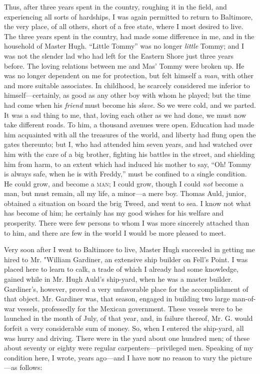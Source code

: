 Thus, after three years spent in the country, roughing it in the field,
and experiencing all sorts of hardships, I was again permitted to return
to Baltimore, the very place, of all others, short of a free state,
where I {\protect\hypertarget{307}{}{}}most desired to live. The three
years spent in the country, had made some difference in me, and in the
household of Master Hugh. ``Little Tommy'' was no longer \emph{little}
Tommy; and I was not the slender lad who had left for the Eastern Shore
just three years before. The loving relations between me and Mas' Tommy
were broken up. He was no longer dependent on me for protection, but
felt himself a \emph{man}, with other and more suitable associates. In
childhood, he scarcely considered me inferior to himself---certainly, as
good as any other boy with whom he played; but the time had come when
his \emph{friend} must become his \emph{slave}. So we were cold, and we
parted. It was a sad thing to me, that, loving each other as we had
done, we must now take different roads. To him, a thousand avenues were
open. Education had made him acquainted with all the treasures of the
world, and liberty had flung open the gates thereunto; but I, who had
attended him seven years, and had watched over him with the care of a
big brother, fighting his battles in the street, and shielding him from
harm, to an extent which had induced his mother to say, ``Oh! Tommy is
always safe, when he is with Freddy,'' must be confined to a single
condition. He could grow, and become a \textsc{man}; I could grow,
though I could \emph{not} become a man, but must remain, all my life, a
minor---a mere boy. Thomas Auld, junior, obtained a situation on board
the brig Tweed, and went to sea. I know not what has become of him; he
certainly has my good wishes for his welfare and prosperity. There were
few persons to whom I was more sincerely attached
{\protect\hypertarget{308}{}{}}than to him, and there are few in the
world I would be more pleased to meet.

Very soon after I went to Baltimore to live, Master Hugh succeeded in
getting me hired to Mr. "William Gardiner, an extensive ship builder on
Fell's Point. I was placed here to learn to calk, a trade of which I
already had some knowledge, gained while in Mr. Hugh Auld's ship-yard,
when he was a master builder. Gardiner's, however, proved a very
unfavorable place for the accomplishment of that object. Mr. Gardiner
was, that season, engaged in building two large man-of-war vessels,
professedly for the Mexican government. These vessels were to be
launched in the month of July, of that year, and, in failure thereof,
Mr. G. would forfeit a very considerable sum of money. So, when I
entered the ship-yard, all was hurry and driving. There were in the yard
about one hundred men; of these about seventy or eighty were regular
carpenters---privileged men. Speaking of my condition here, I wrote,
years ago---and I have now no reason to vary the picture---as follows:

